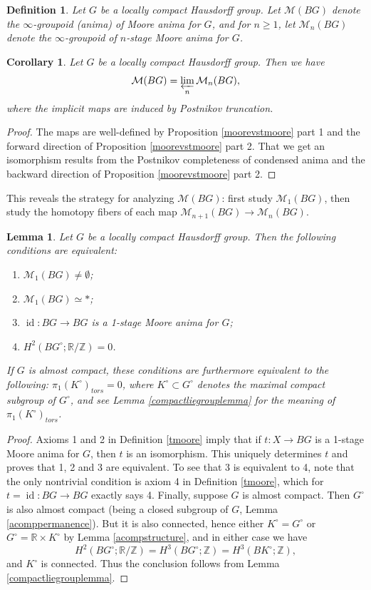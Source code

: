 \documentclass[12pt]{article}
\newtheorem{lemma}[theorem]{Lemma}
\newtheorem{corollary}[theorem]{Corollary}
\newtheorem{definition}[theorem]{Definition}
\theoremstyle{definition}
\newcommand{\on}{\operatorname}
\newcommand{\mc}{\mathcal}
\newcommand{\mbb}{\mathbb}
\begin{document}
\begin{definition}
Let $G$ be a locally compact Hausdorff group.  Let $\mathcal{M}(BG)$ denote the $\infty$-groupoid (anima) of Moore anima for $G$, and for $n\geq 1$, let $\mathcal{M}_n(BG)$ denote the $\infty$-groupoid of $n$-stage Moore anima for $G$.
\end{definition}

\begin{corollary}\label{moorecaninduct}
Let $G$ be a locally compact Hausdorff group.  Then we have
$$\mathcal{M}(BG) = \varprojlim_n \mathcal{M}_n(BG),$$
where the implicit maps are induced by Postnikov truncation.
\end{corollary}
\begin{proof}
The maps are well-defined by Proposition \ref{moorevstmoore} part 1 and the forward direction of Proposition \ref{moorevstmoore} part 2.  That we get an isomorphism results from the Postnikov completeness of condensed anima and the backward direction of Proposition \ref{moorevstmoore} part 2.
\end{proof}

This reveals the strategy for analyzing $\mathcal{M}(BG)$: first study $\mathcal{M}_1(BG)$, then study the homotopy fibers of each map $\mathcal{M}_{n+1}(BG)\to \mc{M}_n(BG)$.

\begin{lemma}\label{moore1}
Let $G$ be a locally compact Hausdorff group.  Then the following conditions are equivalent:
\begin{enumerate}
\item $\mathcal{M}_1(BG)\neq\emptyset$;
\item $\mathcal{M}_1(BG)\simeq \ast$;
\item $\on{id}:BG \to BG$ is a 1-stage Moore anima for $G$;
\item $H^2(BG^\circ;\mbb{R}/\mbb{Z})=0$.
\end{enumerate}
If $G$ is almost compact, these conditions are furthermore equivalent to the following: $\pi_1(K^\circ)_{tors}=0$, where $K^\circ \subset G^\circ$ denotes the maximal compact subgroup of $G^\circ$, and see Lemma \ref{compactliegrouplemma} for the meaning of $\pi_1(K^\circ)_{tors}$.
\end{lemma}
\begin{proof}
Axioms 1 and 2 in Definition \ref{tmoore} imply that if $t:X\to BG$ is a 1-stage Moore anima for $G$, then $t$ is an isomorphism.  This uniquely determines $t$ and proves that 1, 2 and 3 are equivalent.  To see that 3 is equivalent to 4, note that the only nontrivial condition is axiom 4 in Definition \ref{tmoore}, which for $t=\on{id}:BG\to BG$ exactly says 4.  Finally, suppose $G$ is almost compact.  Then $G^\circ$ is also almost compact (being a closed subgroup of $G$, Lemma \ref{acomppermanence}).  But it is also connected, hence either $K^\circ=G^\circ$ or $G^\circ = \mbb{R}\times K^\circ$ by Lemma \ref{acompstructure}, and in either case we have
$$H^2(BG^\circ;\mbb{R}/\mbb{Z})=H^3(BG^\circ;\mbb{Z}) = H^3(BK^\circ;\mbb{Z}),$$
and $K^\circ$ is connected.  Thus the conclusion follows from Lemma \ref{compactliegrouplemma}.
\end{proof}
\end{document}
